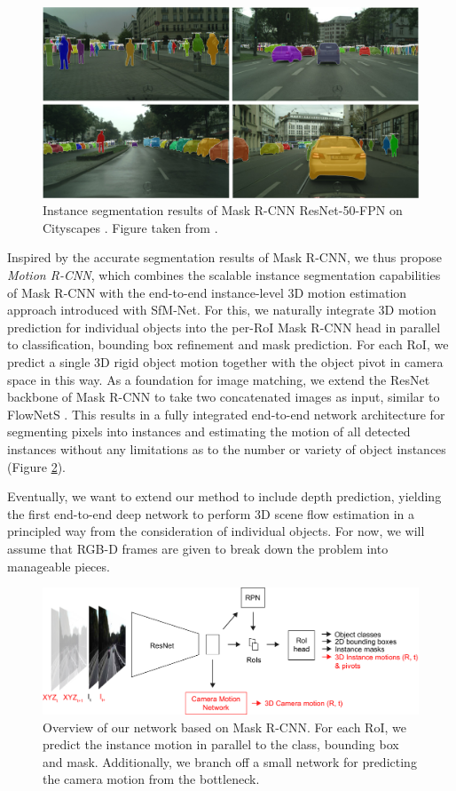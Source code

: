 \begin{figure}[t]
  \centering
  \includegraphics[width=\textwidth]{figures/maskrcnn_cs}
\caption{
Instance segmentation results of Mask R-CNN ResNet-50-FPN \cite{MaskRCNN}
on Cityscapes \cite{Cityscapes}. Figure taken from \cite{MaskRCNN}.
}
\label{figure:maskrcnn_cs}
\end{figure}
Inspired by the accurate segmentation results of Mask R-CNN,
we thus propose \emph{Motion R-CNN}, which combines the scalable instance segmentation capabilities of
Mask R-CNN with the end-to-end instance-level 3D motion estimation approach introduced with SfM-Net.
For this, we naturally integrate 3D motion prediction for individual objects into the per-RoI Mask R-CNN head
in parallel to classification, bounding box refinement and mask prediction.
For each RoI, we predict a single 3D rigid object motion together with the object
pivot in camera space in this way.
As a foundation for image matching, we extend the ResNet \cite{ResNet} backbone of Mask R-CNN to take
two concatenated images as input, similar to FlowNetS \cite{FlowNet}.
This results in a fully integrated end-to-end network architecture for segmenting pixels into instances
and estimating the motion of all detected instances without any limitations
as to the number or variety of object instances (Figure \ref{figure:net_intro}).

Eventually, we want to extend our method to include depth prediction,
yielding the first end-to-end deep network to perform 3D scene flow estimation
in a principled way from the consideration of individual objects.
For now, we will assume that RGB-D frames are given to break down the problem into
manageable pieces.

\begin{figure}[t]
  \centering
  \includegraphics[width=\textwidth]{figures/net_intro}
\caption{
Overview of our network based on Mask R-CNN. For each RoI, we predict the instance motion
in parallel to the class, bounding box and mask. Additionally, we branch off a
small network for predicting the camera motion from the bottleneck.
}
\label{figure:net_intro}
\end{figure}

